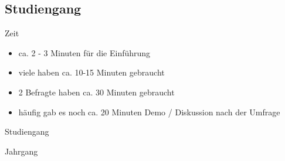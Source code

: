 
\subsection{Studiengang}

\begin{frame}{Zeit}
\begin{itemize}
    \item ca. 2 - 3 Minuten für die Einführung
    \item viele haben ca. 10-15 Minuten gebraucht
    \item 2 Befragte haben ca. 30 Minuten gebraucht
    \item häufig gab es noch ca. 20 Minuten Demo / Diskussion nach der Umfrage
\end{itemize}
\end{frame}

\begin{frame}{Studiengang}
\end{frame}

\begin{frame}{Jahrgang}
\end{frame}